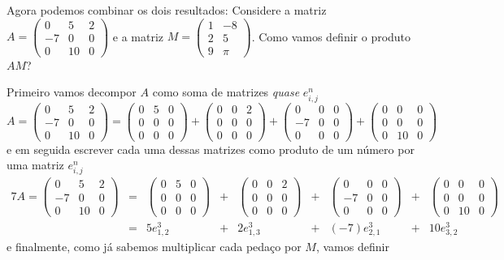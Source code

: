 \bigskip
Agora podemos combinar os dois resultados: Considere a matriz $A=\begin{pmatrix}
0 & 5 & 2\\
-7 & 0 & 0\\
0 & 10 & 0
\end{pmatrix}$ e a matriz $M=\begin{pmatrix}
1 & -8\\
2 & 5\\
9 & \pi
\end{pmatrix}$. Como vamos definir o produto $AM$?

Primeiro vamos decompor $A$ como soma de matrizes \textit{quase} $e^n_{i,j}$
\[A=\begin{pmatrix}
0 & 5 & 2\\
-7 & 0 & 0\\
0 & 10 & 0
\end{pmatrix}=\begin{pmatrix}
0 & 5 & 0\\
0&0&0\\
0&0&0
\end{pmatrix}+ \begin{pmatrix}
0 & 0 & 2 \\
0 & 0 & 0 \\
0 & 0 & 0 
\end{pmatrix}  + \begin{pmatrix}
0 & 0 & 0 \\
-7 & 0 & 0 \\
0 & 0 & 0 
\end{pmatrix}  + \begin{pmatrix}
0 & 0 & 0 \\
0 & 0 & 0 \\
0 & 10 & 0 
\end{pmatrix}\]e em seguida escrever cada uma dessas matrizes como produto de um número por uma matriz $e^n_{i,j}$
\begin{alignat*}{7}
A=\begin{pmatrix}
0 & 5 & 2\\
-7 & 0 & 0\\
0 & 10 & 0
\end{pmatrix}&=&\begin{pmatrix}
0 & 5 & 0\\
0&0&0\\
0&0&0
\end{pmatrix}&+&\begin{pmatrix}
0 & 0 & 2 \\
0 & 0 & 0 \\
0 & 0 & 0 
\end{pmatrix}&+&\begin{pmatrix}
0 & 0 & 0 \\
-7 & 0 & 0 \\
0 & 0 & 0 
\end{pmatrix}&+&\begin{pmatrix}
0 & 0 & 0 \\
0 & 0 & 0 \\
0 & 10 & 0 
\end{pmatrix}\\&=&5e^3_{1,2} \quad\ &+&2e^3_{1,3}\quad&+&(-7)e^3_{2,1}\quad&+&10e^3_{3,2}\quad
\end{alignat*}e finalmente, como já sabemos multiplicar cada pedaço por $M$, vamos definir
